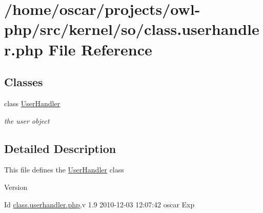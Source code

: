 \section{/home/oscar/projects/owl-\/php/src/kernel/so/class.userhandler.php File Reference}
\label{class_8userhandler_8php}
\subsection*{Classes}
\begin{DoxyCompactItemize}
\item 
class \hyperlink{classUserHandler}{UserHandler}
\begin{DoxyCompactList}\small\item\em the user object \item\end{DoxyCompactList}\end{DoxyCompactItemize}


\subsection{Detailed Description}
This file defines the \hyperlink{classUserHandler}{UserHandler} class \begin{DoxyVersion}{Version}

\end{DoxyVersion}
\begin{DoxyParagraph}{Id}
\hyperlink{class_8userhandler_8php}{class.userhandler.php},v 1.9 2010-\/12-\/03 12:07:42 oscar Exp 
\end{DoxyParagraph}
